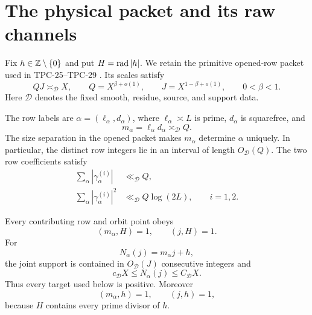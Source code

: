 \section{The physical packet and its raw channels}
\label{sec:tpc30-interface}

Fix $h\in\mathbb Z\setminus\{0\}$ and put $H=\operatorname{rad}|h|$.  We retain the
primitive opened-row packet used in TPC-25--TPC-29
\citep{WangTPC25,WangTPC28,WangTPC29}.  Its scales satisfy
\begin{equation}
 QJ\asymp_{\mathscr D}X,
 \qquad
 Q=X^{\beta+o(1)},
 \qquad
 J=X^{1-\beta+o(1)},
 \qquad 0<\beta<1.
 \label{eq:tpc30-row-scales}
\end{equation}
Here $\mathscr D$ denotes the fixed smooth, residue, source, and
support data.

The row labels are $\alpha=(\ell_\alpha,d_\alpha)$, where
$\ell_\alpha\asymp L$ is prime, $d_\alpha$ is squarefree, and
\begin{equation}
 m_\alpha=\ell_\alpha d_\alpha\asymp_{\mathscr D}Q.
 \label{eq:tpc30-opened-rows}
\end{equation}
The size separation in the opened packet makes $m_\alpha$ determine
$\alpha$ uniquely.  In particular, the distinct row integers lie in
an interval of length $O_{\mathscr D}(Q)$.  The two row coefficients
satisfy
\begin{align}
 \sum_\alpha|\gamma_\alpha^{(i)}|
 &\ll_{\mathscr D}Q,
 \label{eq:tpc30-row-l1}\\
 \sum_\alpha|\gamma_\alpha^{(i)}|^2
 &\ll_{\mathscr D}Q\log(2L),
 \qquad i=1,2.
 \label{eq:tpc30-row-l2}
\end{align}

Every contributing row and orbit point obeys
\begin{equation}
 (m_\alpha,H)=1,
 \qquad
 (j,H)=1.
 \label{eq:tpc30-primitive-orbit}
\end{equation}
For
\begin{equation}
 N_\alpha(j)=m_\alpha j+h,
 \label{eq:tpc30-target}
\end{equation}
the joint support is contained in $O_{\mathscr D}(J)$ consecutive
integers and
\begin{equation}
 c_{\mathscr D}X\le N_\alpha(j)
 \le C_{\mathscr D}X.
 \label{eq:tpc30-target-window}
\end{equation}
Thus every target used below is positive.  Moreover
\begin{equation}
 (m_\alpha,h)=1,
 \qquad
 (j,h)=1,
 \label{eq:tpc30-full-primitivity}
\end{equation}
because $H$ contains every prime divisor of $h$.

